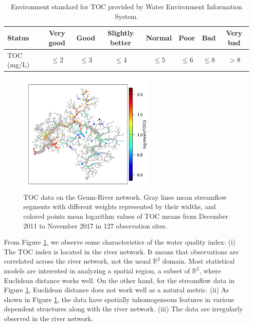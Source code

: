 \documentclass[11pt,titlepage]{article}
\begin{document}
\begin{table}[!h]
	\centering	
	\caption{Environment standard for TOC provided by Water Environment Information System.}
	\begin{tabular}{|l|c|c|c|c|c|c|c|}
		\hline
		Status & Very good & Good & Slightly better & Normal & Poor & Bad & Very bad \\ \hline
		TOC (mg/L) & $\leq 2$ & $\leq 3$ & $\leq 4$ & $\leq 5$ & $\leq 6$ & $\leq 8$ & $>8$ \\ \hline
\end{tabular}
	\label{table:table1}
\end{table}

\begin{figure}
	\centering
	\includegraphics[width=0.6\textwidth]{Stream_result/Figure01.png}
	\vspace{-2mm}
	\caption{TOC data on the Geum-River network. Gray lines mean streamflow segments with different weights represented by their widths, and colored points mean logarithm values of TOC means from December 2011 to November 2017 in 127 observation sites.}
	\label{fig:fig1}
\end{figure}

From Figure \ref{fig:fig1}, we observe some characteristics of the water quality index: (i) The TOC index is located in the river network. It means that observations are correlated across the river network, not the usual $\mathbb{R}^2$ domain. Most statistical models are interested in analyzing a spatial region, a subset of $\mathbb{R}^2$, where Euclidean distance works well. On the other hand, for the streamflow data in Figure \ref{fig:fig1}, Euclidean distance does not work well as a natural metric. (ii) As shown in Figure \ref{fig:fig1}, the data have spatially inhomogeneous features in various dependent structures along with the river network. (iii) The data are irregularly observed in the river network.  
\end{document}
